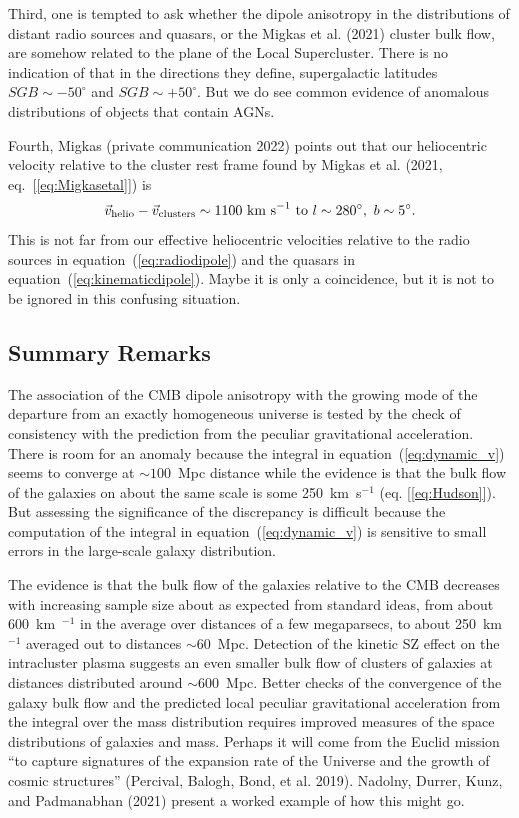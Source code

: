 \documentclass[fleqn,12pt]{article}
\newcommand{\beq}{\begin{equation}}
\newcommand{\eeq}{\end{equation}}
\begin{document}
Third, one is tempted to ask whether the dipole anisotropy in the distributions of distant radio sources and quasars, or the Migkas et al. (2021) cluster bulk flow, are somehow related to the plane of the Local Supercluster. There is no indication of that in the directions  they define, supergalactic latitudes $SGB\sim -50^\circ$ and $SGB\sim +50^\circ$. But we do see common evidence of anomalous distributions of objects that contain AGNs.

Fourth, Migkas (private communication 2022) points out that our heliocentric velocity relative to the cluster rest frame found by Migkas et al. (2021, eq.~[\ref{eq:Migkasetal}]) is 
\beq
{\vec v}_{\rm helio} - {\vec v}_{\rm clusters}  \sim 1100\hbox{ km s}^{-1}\hbox{ to } l \sim 280^\circ,\ b \sim 5^\circ.\label{eq:Kostas}
\eeq
This is not far from our effective heliocentric velocities relative to the radio sources in equation~(\ref{eq:radiodipole}) and the quasars in equation~(\ref{eq:kinematicdipole}). Maybe it is only a coincidence, but it is not to be ignored in this confusing situation. 

\subsection{Summary Remarks} \label{sec:remarks}

The association of the CMB dipole anisotropy with the growing mode of the departure from an exactly homogeneous universe is tested by the check of consistency with the prediction from the peculiar gravitational acceleration. There is room for an anomaly because the integral  in equation~(\ref{eq:dynamic_v}) seems to converge at $\sim 100$~Mpc distance while the evidence is that the bulk flow of the galaxies on about the same scale is some 250~km~s$^{-1}$ (eq. [\ref{eq:Hudson}]). But assessing the significance of the discrepancy is difficult because the computation of the integral in equation~(\ref{eq:dynamic_v}) is sensitive to small errors in the large-scale galaxy distribution.

The evidence is that the bulk flow of the galaxies relative to the CMB decreases with increasing sample size about as expected from standard ideas, from about 600~km~$^{-1}$ in the average over distances of a few megaparsecs, to about 250~km~$^{-1}$ averaged out to distances $\sim 60$~Mpc. Detection of the kinetic SZ effect on the intracluster plasma suggests an even smaller bulk flow of clusters of galaxies at distances distributed around $\sim 600$~Mpc. Better checks of the convergence of the galaxy bulk flow and the predicted local peculiar gravitational acceleration from the integral over the mass distribution requires improved  measures of the space distributions of galaxies and mass. Perhaps it will come from the Euclid mission ``to capture signatures of the expansion rate of the Universe and the growth of cosmic structures'' (Percival, Balogh, Bond, et al. 2019). Nadolny, Durrer, Kunz, and Padmanabhan (2021) present a worked example of how this might go.
\end{document}
